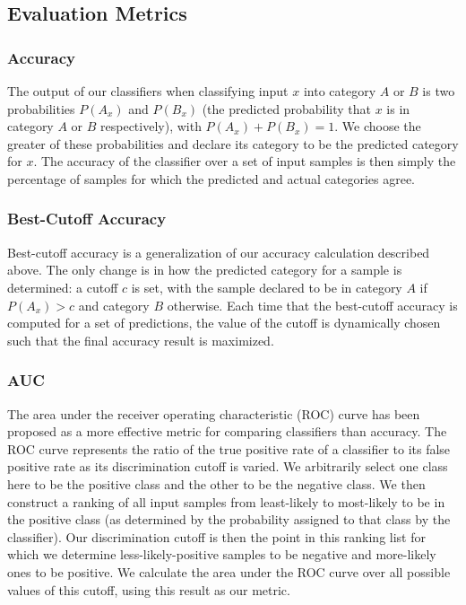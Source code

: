 \documentclass{article} %
\begin{document}
\subsection{Evaluation Metrics}
\subsubsection{Accuracy}
The output of our classifiers when classifying input $x$ into category $A$ or $B$ is two probabilities $P(A_x)$ and $P(B_x)$ (the predicted probability that $x$ is in category $A$ or $B$ respectively), with $P(A_x)+P(B_x)=1$.  We choose the greater of these probabilities and declare its category to be the predicted category for $x$.  The accuracy of the classifier over a set of input samples is then simply the percentage of samples for which the predicted and actual categories agree.
\subsubsection{Best-Cutoff Accuracy}
Best-cutoff accuracy is a generalization of our accuracy calculation described above.  The only change is in how the predicted category for a sample is determined: a cutoff $c$ is set, with the sample declared to be in category $A$ if $P(A_x) > c$ and category $B$ otherwise.  Each time that the best-cutoff accuracy is computed for a set of predictions, the value of the cutoff is dynamically chosen such that the final accuracy result is maximized.
\subsubsection{AUC}
The area under the receiver operating characteristic (ROC) curve has been proposed \cite{DBLP:conf/ijcai/LingHZ03} as a more effective metric for comparing classifiers than accuracy.  The ROC curve represents the ratio of the true positive rate of a classifier to its false positive rate as its discrimination cutoff is varied.  We arbitrarily select one class here to be the positive class and the other to be the negative class.  We then construct a ranking of all input samples from least-likely to most-likely to be in the positive class (as determined by the probability assigned to that class by the classifier).  Our discrimination cutoff is then the point in this ranking list for which we determine less-likely-positive samples to be negative and more-likely ones to be positive.  We calculate the area under the ROC curve over all possible values of this cutoff, using this result as our metric.
\end{document}
